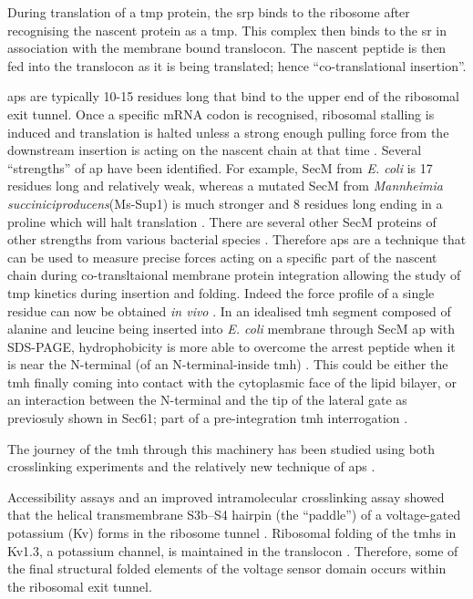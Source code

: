 During translation of a \gls{tmp} protein, the \gls{srp} binds to the ribosome after recognising the nascent protein as a \gls{tmp}.
This complex then binds to the \gls{sr} in association with the membrane bound translocon.
The nascent peptide is then fed into the translocon as it is being translated; hence ``co-translational insertion''.

\gls{ap}s are typically 10-15 residues long that bind to the upper end of the ribosomal exit tunnel.
Once a specific mRNA codon is recognised, ribosomal stalling is induced \cite{Ito2010} and translation is halted unless a strong enough pulling force from the downstream insertion is acting on the nascent chain at that time \cite{Butkus2013}.
Several ``strengths'' of \gls{ap} have been identified.
For example, SecM from \textit{E. coli} is 17 residues long and relatively weak, whereas a mutated SecM from \textit{Mannheimia succiniciproducens}(Ms-Sup1) is much stronger and 8 residues long ending in a proline which will halt translation \cite{Ismail2012}.
There are several other SecM proteins of other strengths from various bacterial species \cite{Yap2009}.
Therefore \gls{ap}s are a technique that can be used to measure precise forces acting on a specific part of the nascent chain during co-transltaional membrane protein integration allowing the study of \gls{tmp} kinetics during insertion and folding.
Indeed the force profile of a single residue can now be obtained \textit{in vivo} \cite{Ismail2012}.
In an idealised \gls{tmh} segment composed of alanine and leucine being inserted into \textit{E. coli} membrane through SecM \gls{ap} with SDS-PAGE, hydrophobicity is more able to overcome the arrest peptide when it is near the N-terminal (of an N-terminal-inside \gls{tmh}) \cite{Ismail2012}.
This could be either the \gls{tmh} finally coming into contact with the cytoplasmic face of the lipid bilayer, or an interaction between the N-terminal and the tip of the lateral gate as previosuly shown in Sec61; part of a pre-integration \gls{tmh} interrogation \cite{MacKinnon2014}.

The journey of the \gls{tmh} through this machinery has been studied using both crosslinking experiments and the relatively new technique of \gls{ap}s \cite{Cymer2015}.

Accessibility assays and an improved intramolecular crosslinking assay showed that the helical transmembrane S3b–S4 hairpin (the “paddle”) of a voltage-gated potassium (Kv) forms in the ribosome tunnel \cite{Tu2014}.
Ribosomal folding of the \gls{tmh}s in Kv1.3, a potassium channel, is maintained in the translocon \cite{Tu2010}.
Therefore, some of the final structural folded elements of the voltage sensor domain occurs within the ribosomal exit tunnel.

